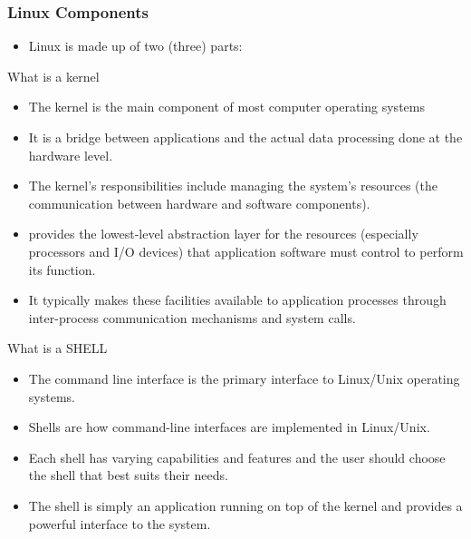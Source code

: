 \documentclass[c,compress,xcolor=svgnames]{beamer}
\newenvironment{eblock}[0]
{
\begin{beamerboxesrounded}[upper=uppercol2,lower=lowercol2,shadow=true]}
{\end{beamerboxesrounded}}
\begin{document}
\begin{frame}[allowframebreaks]
  \frametitle{\small Linux Components}
  \begin{itemize}
    \item Linux is made up of two (three) parts:
  \end{itemize}
  
  \begin{eblock}{What is a kernel}
    \begin{itemize}
      \item The kernel is the main component of most computer operating systems
      \item It is a bridge between applications and the actual data processing done at the hardware level.
      \item The kernel's responsibilities include managing the system's resources (the communication between hardware and software components).
      \item provides the lowest-level abstraction layer for the resources (especially processors and I/O devices) that application software must control to perform its function.
      \item It typically makes these facilities available to application processes through inter-process communication mechanisms and system calls.
    \end{itemize}
  \end{eblock}
  \begin{eblock}{What is a SHELL}
    \begin{itemize}
      \item The command line interface is the primary interface to Linux/Unix operating systems.
      \item Shells are how command-line interfaces are implemented in Linux/Unix.
      \item Each shell has varying capabilities and features and the user should choose the shell that best suits their needs.
      \item The shell is simply an application running on top of the kernel and provides a powerful interface to the system.
    \end{itemize}
  \end{eblock}
\end{frame}
\end{document}
